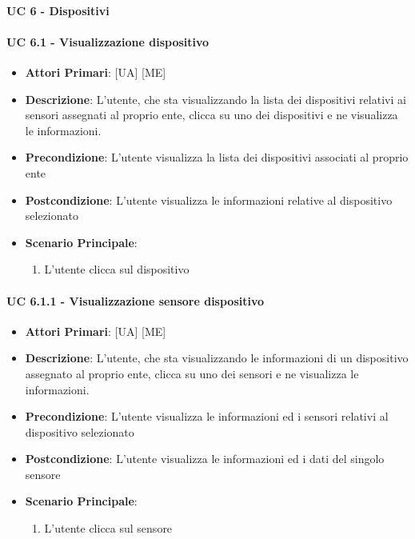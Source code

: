 		\paragraph{UC 6 - Dispositivi} 

			\paragraph{UC 6.1 - Visualizzazione dispositivo}
			\begin{itemize}
				\item \textbf{Attori Primari}: [UA] [ME]
				\item \textbf{Descrizione}: L'utente, che sta visualizzando la lista dei dispositivi relativi ai sensori assegnati al proprio ente, clicca su uno dei dispositivi e ne visualizza le informazioni.
				\item \textbf{Precondizione}: L'utente visualizza la lista dei dispositivi associati al proprio ente
				\item \textbf{Postcondizione}: L'utente visualizza le informazioni relative al dispositivo selezionato
				\item \textbf{Scenario Principale}:
				\begin{enumerate}
					\item{L'utente clicca sul dispositivo}
				\end{enumerate}	
			\end{itemize}

			\paragraph{UC 6.1.1 - Visualizzazione sensore dispositivo}
			\begin{itemize}
				\item \textbf{Attori Primari}: [UA] [ME]
				\item \textbf{Descrizione}: L'utente, che sta visualizzando le informazioni di un dispositivo assegnato al proprio ente, clicca su uno dei sensori e ne visualizza le informazioni.
				\item \textbf{Precondizione}: L'utente visualizza le informazioni ed i sensori relativi al dispositivo selezionato 
				\item \textbf{Postcondizione}: L'utente visualizza le informazioni ed i dati del singolo sensore
				\item \textbf{Scenario Principale}:
				\begin{enumerate}
					\item{L'utente clicca sul sensore}
				\end{enumerate}	
			\end{itemize}


